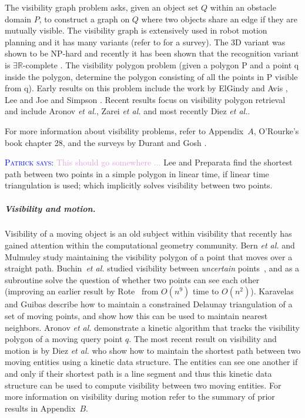 \documentclass[a4paper, UKenglish]{paper}
\newcommand{\myremark}[4]{\textcolor{blue}{\textsc{#1 #2:}} \textcolor{#4}{\textsf{#3}}}
\newcommand{\patrick}[2][says]{\myremark{Patrick}{#1}{#2}{Plum}}
\newcommand{\etal}{\textit{et al.}\xspace}
\begin{document}
The visibility graph problem asks, given an object set $Q$ within an obstacle domain $P$, to construct a graph on $Q$ where two objects share an edge if they are mutually visible. The visibility graph is extensively used in robot motion planning \cite{de1997computational} and it has many variants (refer to \cite{Ghosh:2013:UPV:2543581.2543589} for a survey). The 3D variant was shown to be NP-hard \cite{canny1988complexity} and recently it has been shown that the recognition variant is $\exists \mathbb{R}$-complete \cite{cardinal2017recognition}. The visibility polygon problem (given a polygon P and a point q inside the polygon, determine the polygon consisting of all the points in P visible from q). Early results on this problem include the work by ElGindy and Avis \cite{el1981linear}, Lee \cite{lee1983visibility} and Joe and Simpson \cite{joe1987corrections}. Recent results focus on visibility polygon retrieval and include Aronov \etal \cite{aronov2002visibility}, Zarei \etal \cite{zarei2005efficient} and most recently Diez \etal \cite{DKRRS2017KineticAPSPEuroCG}.

For more information about visibility problems, refer to Appendix~$A$, O'Rourke's book \cite{ORourke87} chapter 28, and the surveys by Durant \cite{durand2000multidisciplinary} and Gosh  \cite{Ghosh:2013:UPV:2543581.2543589}. 

\patrick{This should go somewhere ...} Lee and Preparata \cite{LeeP84} find the shortest path between two points in a simple polygon in linear time, if linear time triangulation is used; which implicitly solves visibility between two points.

\subparagraph{Visibility and motion.}

Visibility of a moving object is an old subject within visibility that recently has gained attention within the computational geometry community. Bern \etal \cite{bern1994visibility} and  Mulmuley \cite{mulmuley1991hidden} study maintaining the visibility polygon of a point that moves over a straight path. 
Buchin~\etal studied visibility between {\em uncertain} points~\cite {bkls-rbavil-19}, and as a subroutine solve the question of whether two points can see each other (improving an earlier result by Rote~\cite{r-dc-13} from
$O(n^9)$ time to $O(n^2)$).  Karavelas and Guibas \cite{karavelas2001static} describe how to maintain a constrained Delaunay triangulation of a set of moving points, and show how this can be used to maintain nearest neighbors.
Aronov \etal \cite{aronov2002visibility} demonstrate a kinetic algorithm that tracks the visibility polygon of a moving query point $q$. The most recent result on visibility and motion is by Diez \etal \cite{DKRRS2017KineticAPSPEuroCG} who show how to maintain the shortest path between two moving entities using a kinetic data structure. The entities can see one another if and only if their shortest path is a line segment and thus this kinetic data structure can be used to compute visibility between two moving entities. For more information on visibility during motion refer to the summary of prior results in Appendix~$B$.
\end{document}
